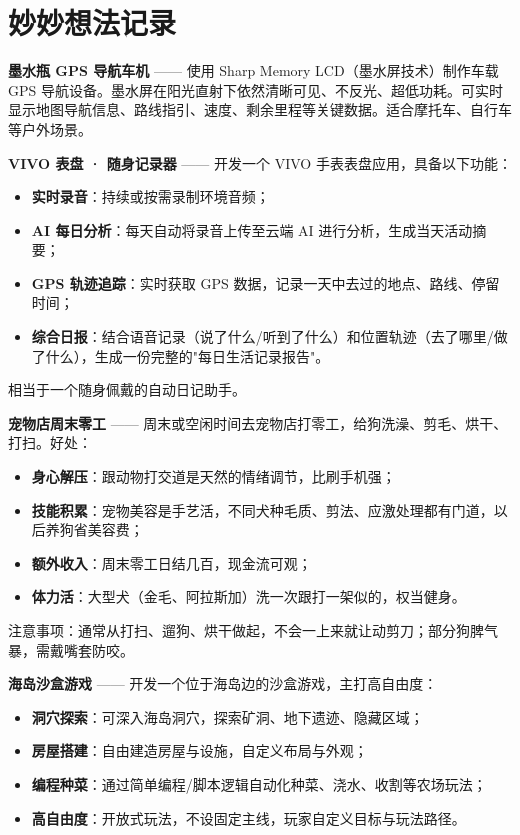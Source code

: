 \section{妙妙想法记录}

\begin{ideabox}
  \textbf{墨水瓶 GPS 导航车机} —— 使用 Sharp Memory LCD（墨水屏技术）制作车载 GPS 导航设备。墨水屏在阳光直射下依然清晰可见、不反光、超低功耗。可实时显示地图导航信息、路线指引、速度、剩余里程等关键数据。适合摩托车、自行车等户外场景。
\end{ideabox}

\begin{ideabox}
  \textbf{VIVO 表盘 · 随身记录器} —— 开发一个 VIVO 手表表盘应用，具备以下功能：
  \begin{itemize}
    \item \textbf{实时录音}：持续或按需录制环境音频；
    \item \textbf{AI 每日分析}：每天自动将录音上传至云端 AI 进行分析，生成当天活动摘要；
    \item \textbf{GPS 轨迹追踪}：实时获取 GPS 数据，记录一天中去过的地点、路线、停留时间；
    \item \textbf{综合日报}：结合语音记录（说了什么/听到了什么）和位置轨迹（去了哪里/做了什么），生成一份完整的"每日生活记录报告"。
  \end{itemize}
  相当于一个随身佩戴的自动日记助手。
\end{ideabox}

\begin{ideabox}
  \textbf{宠物店周末零工} —— 周末或空闲时间去宠物店打零工，给狗洗澡、剪毛、烘干、打扫。好处：
  \begin{itemize}
    \item \textbf{身心解压}：跟动物打交道是天然的情绪调节，比刷手机强；
    \item \textbf{技能积累}：宠物美容是手艺活，不同犬种毛质、剪法、应激处理都有门道，以后养狗省美容费；
    \item \textbf{额外收入}：周末零工日结几百，现金流可观；
    \item \textbf{体力活}：大型犬（金毛、阿拉斯加）洗一次跟打一架似的，权当健身。
  \end{itemize}
  注意事项：通常从打扫、遛狗、烘干做起，不会一上来就让动剪刀；部分狗脾气暴，需戴嘴套防咬。
\end{ideabox}

\begin{ideabox}
  \textbf{海岛沙盒游戏} —— 开发一个位于海岛边的沙盒游戏，主打高自由度：
  \begin{itemize}
    \item \textbf{洞穴探索}：可深入海岛洞穴，探索矿洞、地下遗迹、隐藏区域；
    \item \textbf{房屋搭建}：自由建造房屋与设施，自定义布局与外观；
    \item \textbf{编程种菜}：通过简单编程/脚本逻辑自动化种菜、浇水、收割等农场玩法；
    \item \textbf{高自由度}：开放式玩法，不设固定主线，玩家自定义目标与玩法路径。
  \end{itemize}
\end{ideabox}
